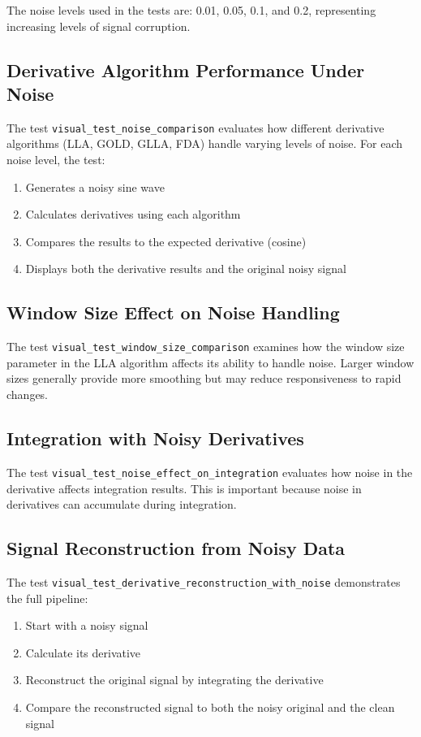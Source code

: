 \documentclass{article}
\begin{document}
The noise levels used in the tests are: 0.01, 0.05, 0.1, and 0.2, representing increasing levels of signal corruption.

\subsection{Derivative Algorithm Performance Under Noise}

The test \texttt{visual\_test\_noise\_comparison} evaluates how different derivative algorithms (LLA, GOLD, GLLA, FDA) handle varying levels of noise. For each noise level, the test:

\begin{enumerate}
    \item Generates a noisy sine wave
    \item Calculates derivatives using each algorithm
    \item Compares the results to the expected derivative (cosine)
    \item Displays both the derivative results and the original noisy signal
\end{enumerate}

\subsection{Window Size Effect on Noise Handling}

The test \texttt{visual\_test\_window\_size\_comparison} examines how the window size parameter in the LLA algorithm affects its ability to handle noise. Larger window sizes generally provide more smoothing but may reduce responsiveness to rapid changes.

\subsection{Integration with Noisy Derivatives}

The test \texttt{visual\_test\_noise\_effect\_on\_integration} evaluates how noise in the derivative affects integration results. This is important because noise in derivatives can accumulate during integration.

\subsection{Signal Reconstruction from Noisy Data}

The test \texttt{visual\_test\_derivative\_reconstruction\_with\_noise} demonstrates the full pipeline:
\begin{enumerate}
    \item Start with a noisy signal
    \item Calculate its derivative
    \item Reconstruct the original signal by integrating the derivative
    \item Compare the reconstructed signal to both the noisy original and the clean signal
\end{enumerate}
\end{document}

